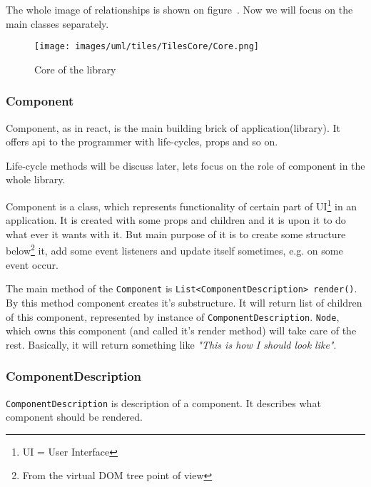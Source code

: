     The whole image of relationships is shown on figure~. Now we will focus on the main classes separately. 
    \begin{figure}[h]
    \centering  
      \texttt{[image: images/uml/tiles/TilesCore/Core.png]}
      \caption{Core of the library}
      \label{img:library-core}
    \end{figure}

    \subsubsection{Component}\label{subsubsec:our-architecture-core-component}
      Component, as in react, is the main building brick of application(library). 
      It offers api to the programmer with life-cycles, props and so on. 

      Life-cycle methods will be discuss later, lets focus on the role of component in the whole library.

      Component is a class, which represents functionality of certain part of UI\footnote{UI = User Interface} in an application.
      It is created with some props and children and it is upon it to do what ever it wants with it. 
      But main purpose of it is to create some structure below\footnote{From the virtual DOM tree point of view} it, 
      add some event listeners and update itself sometimes, e.g. on some event occur.

      The main method of the \texttt{Component} is \texttt{List<ComponentDescription> render()}. 
      By this method component creates it's substructure.
      It will return list of children of this component, represented by instance of \texttt{ComponentDescription}. 
      \texttt{Node}, which owns this component (and called it's render method) will take care of the rest.
      Basically, it will return something like \textit{"This is how I should look like"}.
      
    \subsubsection{ComponentDescription}\label{subsubsec:our-architecture-core-component-description}
    \texttt{ComponentDescription} is description of a component. 
    It describes what component should be rendered.


